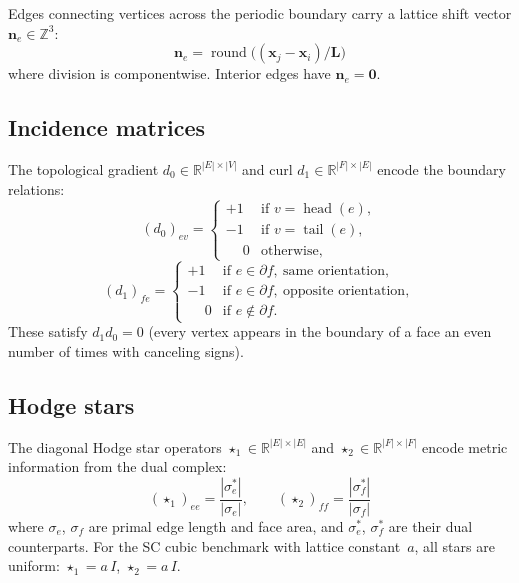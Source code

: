 \documentclass[preprint,12pt]{elsarticle}
\begin{document}
Edges connecting vertices across the periodic boundary carry a lattice shift vector $\mathbf{n}_e \in \mathbb{Z}^3$:
\begin{equation}\label{eq:shift}
  \mathbf{n}_e = \operatorname{round}\!\bigl((\mathbf{x}_j - \mathbf{x}_i) / \mathbf{L}\bigr)
\end{equation}
where division is componentwise. Interior edges have $\mathbf{n}_e = \mathbf{0}$.

\subsection{Incidence matrices}

The topological gradient $d_0 \in \mathbb{R}^{|E|\times|V|}$ and curl $d_1 \in \mathbb{R}^{|F|\times|E|}$ encode the boundary relations:
\begin{equation}\label{eq:d0}
  (d_0)_{ev} = \begin{cases}
    +1 & \text{if } v = \operatorname{head}(e), \\
    -1 & \text{if } v = \operatorname{tail}(e), \\
    \phantom{+}0  & \text{otherwise},
  \end{cases}
\end{equation}
\begin{equation}\label{eq:d1}
  (d_1)_{fe} = \begin{cases}
    +1 & \text{if } e \in \partial f,\ \text{same orientation}, \\
    -1 & \text{if } e \in \partial f,\ \text{opposite orientation}, \\
    \phantom{+}0  & \text{if } e \notin \partial f.
  \end{cases}
\end{equation}
These satisfy $d_1 d_0 = 0$ (every vertex appears in the boundary of a face an even number of times with canceling signs).

\subsection{Hodge stars}

The diagonal Hodge star operators $\star_1 \in \mathbb{R}^{|E|\times|E|}$ and $\star_2 \in \mathbb{R}^{|F|\times|F|}$ encode metric information from the dual complex:
\begin{equation}\label{eq:stars}
  (\star_1)_{ee} = \frac{|\sigma^*_e|}{|\sigma_e|}, \qquad
  (\star_2)_{ff} = \frac{|\sigma^*_f|}{|\sigma_f|}
\end{equation}
where $\sigma_e$, $\sigma_f$ are primal edge length and face area, and $\sigma^*_e$, $\sigma^*_f$ are their dual counterparts. For the SC cubic benchmark with lattice constant~$a$, all stars are uniform: $\star_1 = a\,I$, $\star_2 = a\,I$.
\end{document}
